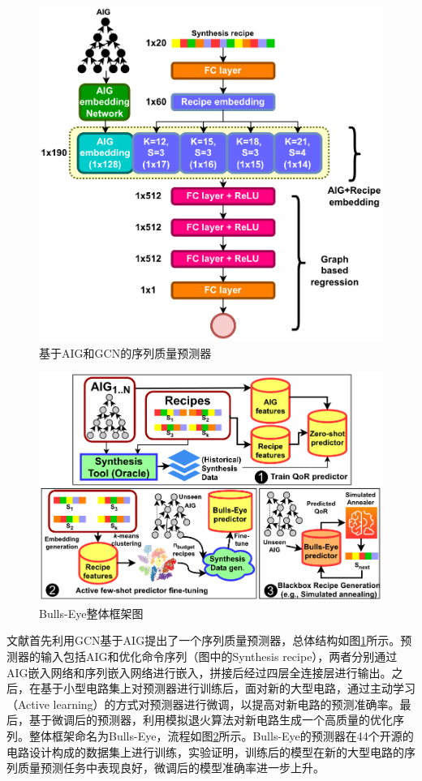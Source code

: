 \begin{figure}[!htbp]
    \centering
    \includegraphics[width=0.7\linewidth]{./figs/LS-Bulls-Eye-QoR_predictor.png}
    \caption{基于AIG和GCN的序列质量预测器}
    \label{LS:Bulls-Eye:Fig:QoR_predictor}
\end{figure}

\begin{figure}[!htbp]
    \centering
    \includegraphics[width=0.9\linewidth]{./figs/LS-Bulls-Eye-overall_framework.png}
    \caption{Bulls-Eye整体框架图}
    \label{LS:Bulls-Eye:Fig:overall_framework}
\end{figure}

文献\cite{LS:Bulls-Eye}首先利用GCN基于AIG提出了一个序列质量预测器，总体结构如图\ref{LS:Bulls-Eye:Fig:QoR_predictor}所示。预测器的输入包括AIG和优化命令序列（图中的Synthesis recipe），两者分别通过AIG嵌入网络和序列嵌入网络进行嵌入，拼接后经过四层全连接层进行输出。之后，在基于小型电路集上对预测器进行训练后，面对新的大型电路，通过主动学习（Active learning）的方式对预测器进行微调，以提高对新电路的预测准确率。最后，基于微调后的预测器，利用模拟退火算法对新电路生成一个高质量的优化序列。整体框架命名为Bulls-Eye，流程如图\ref{LS:Bulls-Eye:Fig:overall_framework}所示。Bulls-Eye的预测器在44个开源的电路设计构成的数据集上进行训练，实验证明，训练后的模型在新的大型电路的序列质量预测任务中表现良好，微调后的模型准确率进一步上升。


